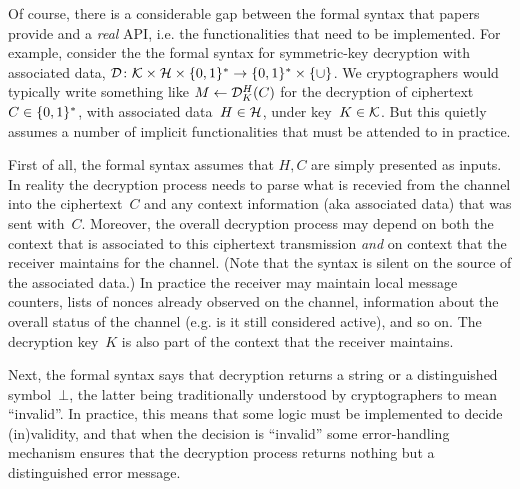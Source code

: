 
Of course, there is a considerable gap between the formal syntax that
papers provide and a \emph{real} API, i.e. the functionalities that
need to be implemented.  For example, consider the
the formal syntax for symmetric-key decryption with associated data, $\mathcal{D}\colon\mathcal{K}
\times \mathcal{H} \times \{0,1\}^* \to \{0,1\}^* \times \{\cup\}$.  We
cryptographers would typically write something like $M \gets
\mathcal{D}^H_K(C)$ for the decryption of ciphertext~$C\in\{0,1\}^*$, with associated
data~$H \in \mathcal{H}$, under key~$K \in \mathcal{K}$.  
But this quietly assumes a number of implicit functionalities that
must be attended to in practice.  

First of all, the formal syntax assumes that $H,C$ are simply
presented as inputs.  In reality the decryption process needs to parse what is recevied from the
channel into the ciphertext~$C$ and any context information (aka
associated data) that was sent with~$C$.  Moreover, the overall
decryption process may depend on both the context that is associated
to this ciphertext transmission \emph{and} on context that the
receiver maintains for the channel.  (Note that the syntax is silent
on the source of the associated data.)  In practice the receiver may
maintain local message counters, lists of nonces already observed on
the channel, information about the overall status of the channel
(e.g. is it still considered active), and so on.  The decryption
key~$K$ is also part of the context that the receiver maintains.

Next, the formal syntax says that decryption returns a
string or a distinguished symbol~$\bot$, the latter being
traditionally understood by cryptographers to mean ``invalid''.  In
practice, this means that some logic must be implemented to decide
(in)validity, and that when the decision is ``invalid'' some
error-handling mechanism ensures that the decryption process returns
nothing but a distinguished error message.




